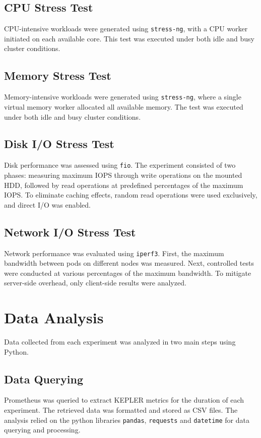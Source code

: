 \subsection{CPU Stress Test}
CPU-intensive workloads were generated using \texttt{stress-ng}, with a CPU worker initiated on each available core. This test was executed under both idle and busy cluster conditions.

\subsection{Memory Stress Test}
Memory-intensive workloads were generated using \texttt{stress-ng}, where a single virtual memory worker allocated all available memory. The test was executed under both idle and busy cluster conditions.

\subsection{Disk I/O Stress Test}
Disk performance was assessed using \texttt{fio}. The experiment consisted of two phases: measuring maximum IOPS through write operations on the mounted HDD, followed by read operations at predefined percentages of the maximum IOPS. To eliminate caching effects, random read operations were used exclusively, and direct I/O was enabled.

\subsection{Network I/O Stress Test}
Network performance was evaluated using \texttt{iperf3}. First, the maximum bandwidth between pods on different nodes was measured. Next, controlled tests were conducted at various percentages of the maximum bandwidth. To mitigate server-side overhead, only client-side results were analyzed.

\section{Data Analysis}
Data collected from each experiment was analyzed in two main steps using Python.

\subsection{Data Querying}
Prometheus was queried to extract KEPLER metrics for the duration of each experiment. The retrieved data was formatted and stored as CSV files. The analysis relied on the python libraries \texttt{pandas}, \texttt{requests} and \texttt{datetime} for data querying and processing.

